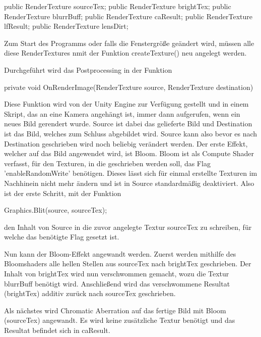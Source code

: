 \begin{csh}
    public RenderTexture sourceTex;
    public RenderTexture brightTex;
    public RenderTexture blurrBuff;
    public RenderTexture caResult;
    public RenderTexture lfResult;
    public RenderTexture lensDirt;
\end{csh}

Zum Start des Programms oder falls die Fenstergrö{\ss}e geändert wird, müssen alle diese RenderTextures nmit der Funktion createTexture() neu angelegt werden.

Durchgeführt wird das Postprocessing in der Funktion 
\begin{csh} 
private void OnRenderImage(RenderTexture source, RenderTexture destination) 
\end{csh}
Diese Funktion wird von der Unity Engine zur Verfügung gestellt und in einem Skript, das an eine Kamera angehängt ist, immer dann aufgerufen, wenn ein neues Bild gerendert wurde. Source ist dabei das gelieferte Bild und Destination ist das Bild, welches zum Schluss abgebildet wird. Source kann also bevor es nach Destination geschrieben wird noch beliebig verändert werden. Der erste Effekt, welcher auf das Bild angewendet wird, ist Bloom. Bloom ist als Compute Shader verfasst, für den Texturen, in die geschrieben werden soll, das Flag 'enableRandomWrite' benötigen. Dieses lässt sich für einmal erstellte Texturen im Nachhinein nicht mehr ändern und ist in Source standardmäßig deaktiviert. Also ist der erste Schritt, mit der Funktion 
\begin{csh}
Graphics.Blit(source, sourceTex);
\end{csh}
 den Inhalt von Source in die zuvor angelegte Textur sourceTex zu schreiben, für welche das benötigte Flag gesetzt ist.


Nun kann der Bloom-Effekt angewandt werden. Zuerst werden mithilfe des Bloomshaders alle hellen Stellen aus sourceTex nach brightTex geschrieben. Der Inhalt von brightTex wird nun verschwommen gemacht, wozu die Textur blurrBuff benötigt wird. Anschlie{\ss}end wird das verschwommene Resultat (brightTex) additiv zurück nach sourceTex geschrieben.


Als nächstes wird Chromatic Aberration auf das fertige Bild mit Bloom (sourceTex) angewandt. Es wird keine zusätzliche Textur benötigt und das Resultat befindet sich in caResult.


